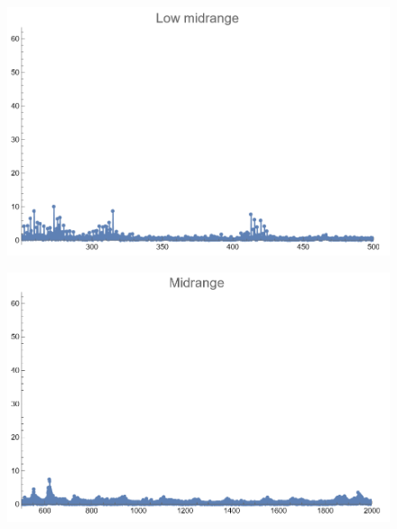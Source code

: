 \documentclass[12pt, letterpaper]{article}
\begin{document}
\begin{figure}[H]
  \centering
  \begin{minipage}{.5\textwidth}
    \centering
    \includegraphics[width=.9\linewidth]{imgs/Cancion9/lowmid.png}
    \label{fig:09d}
  \end{minipage}%
  \begin{minipage}{.5\textwidth}
    \centering
    \includegraphics[width=.9\linewidth]{imgs/Cancion9/mid.png}
    \label{fig:09e}
  \end{minipage}
\end{figure}
\end{document}
